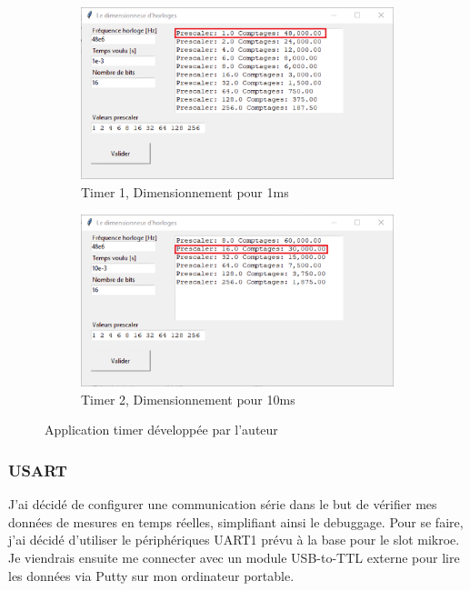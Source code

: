 {	\begin{figure}[h]
		\centering
		\begin{subfigure}[b]{0.45\textwidth}
			\centering
			\includegraphics[width=\textwidth]{Figures/Dev-SOFT/Timer1ms}
			\caption{Timer 1, Dimensionnement pour 1ms}
			\label{fig:timer1ms}
		\end{subfigure}
		\hfill
		\begin{subfigure}[b]{0.45\textwidth}
			\centering
			\includegraphics[width=\textwidth]{Figures/Dev-SOFT/Timer10ms}
			\caption{Timer 2, Dimensionnement pour 10ms}
			\label{fig:timer10ms}
		\end{subfigure}
		\hfill
		\caption{Application timer développée par l'auteur}
		\label{fig:appTimer}
	\end{figure}

	\clearpage

	\subsubsection{USART} 
	J'ai décidé de configurer une communication série dans le but  de vérifier mes données de mesures en temps réelles, simplifiant ainsi le debuggage. Pour se faire, j'ai décidé d'utiliser le périphériques UART1 prévu à la base pour le slot mikroe. Je viendrais ensuite me connecter avec un module USB-to-TTL externe pour lire les données via Putty sur mon ordinateur portable.
	
}
